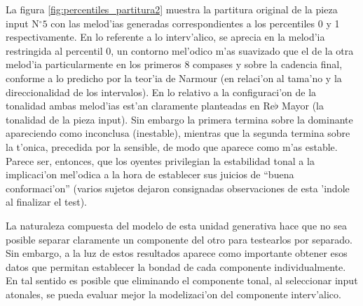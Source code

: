 La figura \ref{fig:percentiles_partitura2} muestra la partitura original de la pieza input N$^{\circ}5$ con las melod'ias generadas correspondientes a los percentiles 0 y 1 respectivamente. 
En lo referente a lo interv'alico, se aprecia en la melod'ia restringida al percentil 0, un contorno mel'odico m'as suavizado que el de la otra melod'ia particularmente 
en los primeros 8 compases y sobre la cadencia final, conforme a lo predicho por la teor'ia de Narmour (en relaci'on al tama'no y la direccionalidad de los intervalos). 
En lo relativo a la configuraci'on de la tonalidad ambas melod'ias est'an claramente planteadas en Re$\flat$ Mayor (la tonalidad de la pieza input). 
Sin embargo la primera termina sobre la dominante apareciendo como inconclusa (inestable), mientras que la segunda termina sobre la t'onica, precedida por la sensible, 
de modo que aparece como m'as estable. Parece ser, entonces, que los oyentes privilegian la estabilidad tonal a la implicaci'on mel'odica a la hora de establecer sus 
juicios de ``buena conformaci'on'' (varios sujetos dejaron consignadas observaciones de esta 'indole al finalizar el test).

La naturaleza compuesta del modelo de esta unidad generativa hace que no sea posible separar claramente un componente del otro para testearlos por separado. 
Sin embargo, a la luz de estos resultados aparece como importante obtener esos datos que permitan establecer la bondad de cada componente individualmente. En tal 
sentido es posible que eliminando el componente tonal, al seleccionar input atonales, se pueda evaluar mejor la modelizaci'on del componente interv'alico.


